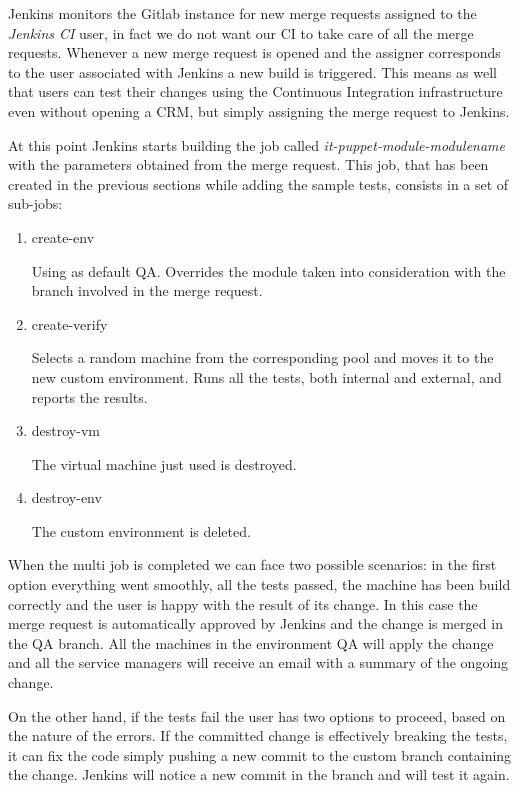 Jenkins monitors the Gitlab instance for new merge requests assigned to
the \textit{Jenkins CI} user, in fact we do not want our CI to take care
of all the merge requests. Whenever a new merge request is opened and the
assigner corresponds to the user associated with Jenkins a new build is
triggered. This means as well that users can test their changes using
the Continuous Integration infrastructure even without opening a CRM, but
simply assigning the merge request to Jenkins.

At this point Jenkins starts building the job called
\textit{it-puppet-module-modulename} with the parameters obtained from the
merge request. This job, that has been created in the previous sections
while adding the sample tests, consists in a set of sub-jobs:

\begin{enumerate}

  \item create-env

  Using as default QA. Overrides the module taken into consideration with
  the branch involved in the merge request.

  \item create-verify

  Selects a random machine from the corresponding pool and moves it to the
  new custom environment. Runs all the tests, both internal and external,
  and reports the results.

  \item destroy-vm

  The virtual machine just used is destroyed.

  \item destroy-env

  The custom environment is deleted.

\end{enumerate}

When the multi job is completed we can face two possible scenarios: in the
first option everything went smoothly, all the tests passed, the machine
has been build correctly and the user is happy with the result of its
change. In this case the merge request is automatically approved by
Jenkins and the change is merged in the QA branch. All the machines in the
environment QA will apply the change and all the service managers will
receive an email with a summary of the ongoing change.

On the other hand, if the tests fail the user has two options to proceed,
based on the nature of the errors. If the committed change is effectively
breaking the tests, it can fix the code simply pushing a new commit to the
custom branch containing the change. Jenkins will notice a new commit in
the branch and will test it again.

